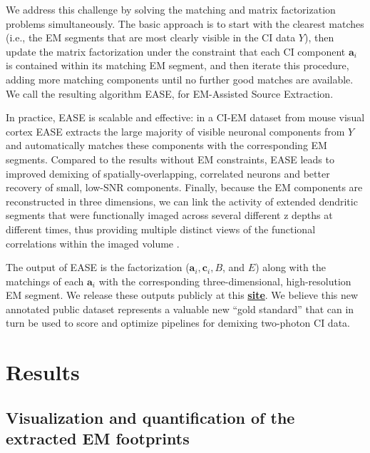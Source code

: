 \documentclass[10pt,letterpaper]{article}
\def \resultURL{https://github.com/zhoupc/ease_project/tree/master/data_sharing}
\begin{document}
We address this challenge by solving the matching and matrix factorization problems simultaneously.  The basic approach is to start with the clearest matches (i.e., the EM segments that are most clearly visible in the CI data $Y$), then update the matrix factorization under the constraint that each CI component $\bm{a}_i$ is contained within its matching EM segment, and then iterate this procedure, adding more matching components until no further good matches are available.  We call the resulting algorithm EASE, for EM-Assisted Source Extraction.

In practice, EASE is scalable and effective: in a CI-EM dataset from mouse visual cortex EASE extracts the large majority of visible neuronal components from $Y$ and automatically matches these components with the corresponding EM segments. Compared to the results without EM constraints, EASE leads to improved demixing of spatially-overlapping, correlated neurons and better recovery of small, low-SNR components. 
Finally, because the EM components are reconstructed in three dimensions, we can link the activity of extended dendritic segments that were functionally imaged across several different z depths at different times, thus providing multiple distinct views of the functional correlations within the imaged volume \citep{Soudry2015}.

The output of EASE is the factorization ($\bm{a}_i, \bm{c}_i, B$, and $E$) along with the matchings of each $\bm{a}_i$ with the corresponding three-dimensional, high-resolution EM segment.  We release these outputs publicly at this \href{\resultURL}{\bf site}. We believe this new annotated public dataset represents a valuable new ``gold standard'' that can in turn be used to score and optimize pipelines for demixing two-photon CI data.  


\section{Results}

\subsection{Visualization and quantification of the extracted EM footprints}
\end{document}
